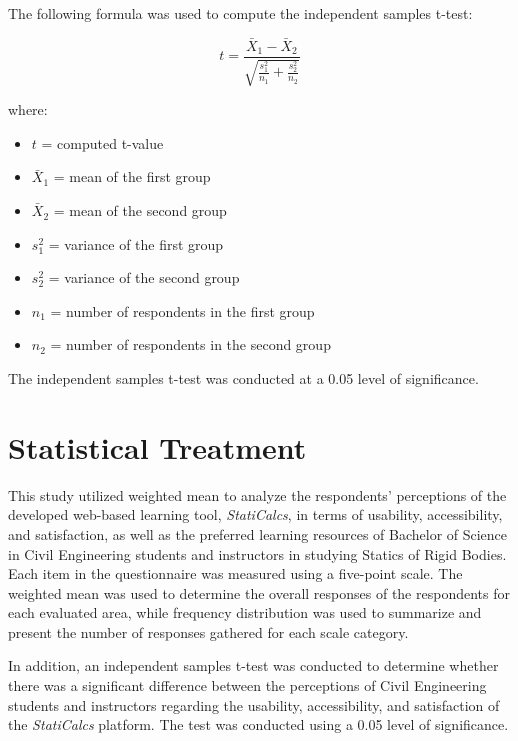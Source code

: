 The following formula was used to compute the independent samples t-test:

\[
t = \frac{\bar{X}_1 - \bar{X}_2}{\sqrt{\frac{s_1^2}{n_1} + \frac{s_2^2}{n_2}}}
\]

where:  

\begin{itemize}
    \item $t$ = computed t-value
    \item $\bar{X}_1$ = mean of the first group
    \item $\bar{X}_2$ = mean of the second group
    \item $s_1^2$ = variance of the first group
    \item $s_2^2$ = variance of the second group
    \item $n_1$ = number of respondents in the first group
    \item $n_2$ = number of respondents in the second group
\end{itemize}

The independent samples t-test was conducted at a 0.05 level of significance.





\section{Statistical Treatment}\label{sec:3-stat}

This study utilized weighted mean to analyze the respondents’ perceptions of the developed web-based learning tool, \textit{StatiCalcs}, in terms of usability, accessibility, and satisfaction, as well as the preferred learning resources of Bachelor of Science in Civil Engineering students and instructors in studying Statics of Rigid Bodies. Each item in the questionnaire was measured using a five-point scale. The weighted mean was used to determine the overall responses of the respondents for each evaluated area, while frequency distribution was used to summarize and present the number of responses gathered for each scale category.

In addition, an independent samples t-test was conducted to determine whether there was a significant difference between the perceptions of Civil Engineering students and instructors regarding the usability, accessibility, and satisfaction of the \textit{StatiCalcs} platform. The test was conducted using a 0.05 level of significance.